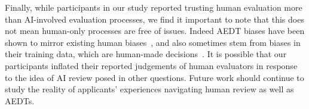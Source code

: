 Finally, while participants in our study reported trusting human evaluation more than AI-involved evaluation processes, we find it important to note that this does not mean human-only processes are free of issues. Indeed AEDT biases have been shown to mirror existing human biases~\cite{caliskan2017semantics}, and also sometimes stem from biases in their training data, which are human-made decisions~\cite{ajunwa2019auditing}. It is possible that our participants inflated their reported judgements of human evaluators in response to the idea of AI review posed in other questions. Future work should continue to study the reality of applicants' experiences navigating human review as well as AEDTs. 